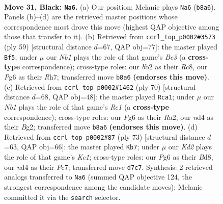 \documentclass[11pt]{article}
\begin{document}
\clearpage

\begin{figure}[p]\centering
\begin{subfigure}{0.46\textwidth}\centering
\resizebox{\linewidth}{!}{%
\newchessgame
\chessboard[
  setfen={rn4r1/1p1kbb1p/6pP/p2pPp2/P2N4/2N3P1/1B5K/R4R2 b - - 6 31},
  showmover=false,
  pgfstyle=straightmove, color=movearrow, markmove={b8-a6}
]}
\caption{}
\end{subfigure}\hfill
\begin{subfigure}{0.46\textwidth}\centering
\resizebox{\linewidth}{!}{%
\newchessgame
\chessboard[
  setfen={2r3k1/7r/1p2b3/p1bpN2p/Pn3P2/1P2P1p1/1B1KB1P1/R6R b - - 0 30},
  showmover=false,
  pgfstyle=straightmove, color=movearrow, markmove={e6-f5}
]}
\caption{}
\end{subfigure}
\\[4pt]
\begin{subfigure}{0.46\textwidth}\centering
\resizebox{\linewidth}{!}{%
\newchessgame
\chessboard[
  setfen={r5k1/2p2pp1/rpNn4/3P3p/P5nP/6P1/R4PB1/2R3K1 w - - 6 36},
  showmover=false,
  pgfstyle=straightmove, color=movearrow, markmove={c1-a1}
]}
\caption{}
\end{subfigure}\hfill
\begin{subfigure}{0.46\textwidth}\centering
\resizebox{\linewidth}{!}{%
\newchessgame
\chessboard[
  setfen={2kbr1n1/2p2r2/p7/1pp1Pp2/7p/2N4P/PPP3PB/4RR1K b - - 7 37},
  showmover=false,
  pgfstyle=straightmove, color=movearrow, markmove={c8-b7}
]}
\caption{}
\end{subfigure}
\caption{\textbf{Move 31, Black: \texttt{Na6}.} (a) Our position; Melanie plays \texttt{Na6} (\texttt{b8a6}). Panels (b)--(d) are the retrieved master positions whose correspondence most drove this move (highest QAP objective among those that transfer to it). (b) Retrieved from \texttt{ccrl\_top\_p0002\#3573} (ply 59) [structural distance $d$=67, QAP obj=77]: the master played \texttt{Bf5}; under $\mu$ our \emph{Nb1} plays the role of that game's \emph{Be3} (a \textbf{cross-type} correspondence); cross-type roles: our \emph{b}b2 as their \emph{R}c8, our \emph{P}g6 as their \emph{R}h7; transferred move \texttt{b8a6} \textbf{(endorses this move)}. (c) Retrieved from \texttt{ccrl\_top\_p0002\#1462} (ply 70) [structural distance $d$=68, QAP obj=48]: the master played \texttt{Rca1}; under $\mu$ our \emph{Nb1} plays the role of that game's \emph{Rc1} (a \textbf{cross-type} correspondence); cross-type roles: our \emph{P}g6 as their \emph{R}a2, our \emph{n}d4 as their \emph{B}g2; transferred move \texttt{b8a6} \textbf{(endorses this move)}. (d) Retrieved from \texttt{ccrl\_top\_p0002\#87} (ply 73) [structural distance $d$=63, QAP obj=66]: the master played \texttt{Kb7}; under $\mu$ our \emph{Kd2} plays the role of that game's \emph{Kc1}; cross-type roles: our \emph{P}g6 as their \emph{B}d8, our \emph{n}d4 as their \emph{P}c7; transferred move \texttt{d7c7}. Synthesis: 2 retrieved analogs transferred to \texttt{Na6} (summed QAP objective 124, the strongest correspondence among the candidate moves); Melanie committed it via the \texttt{search} selector.}
\label{fig:thought-m61}
\end{figure}
\end{document}
